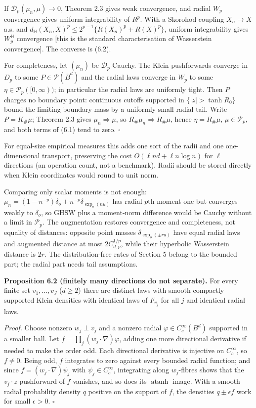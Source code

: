 \documentclass[
  british,
  11pt,
  a4paper,
]{article}
\begin{document}
If \(\mathcal D_p(\mu_n,\mu)\to0\), Theorem 2.3 gives weak convergence,
and radial \(W_p\) convergence gives uniform integrability of \(R^p\).
With a Skorohod coupling \(X_n\to X\) a.s. and
\(d_{\mathbb H}(X_n,X)^p\leq2^{p-1}\{R(X_n)^p+R(X)^p\}\), uniform
integrability gives \(W_p^{\mathbb H}\) convergence {[}this is the
standard characterisation of Wasserstein convergence{]}. The converse is
(6.2).

For completeness, let \((\mu_n)\) be \(\mathcal D_p\)-Cauchy. The Klein
pushforwards converge in \(D_p\) to some
\(P\in\mathcal P(\overline B^d)\) and the radial laws converge in
\(W_p\) to some \(\eta\in\mathcal P_p([0,\infty))\); in particular the
radial laws are uniformly tight. Then \(P\) charges no boundary point:
continuous cutoffs supported in \(\{|z|>\tanh R_0\}\) bound the limiting
boundary mass by a uniformly small radial tail. Write \(P=K_\#\mu\);
Theorem 2.3 gives \(\mu_n\Rightarrow\mu\), so
\(R_\#\mu_n\Rightarrow R_\#\mu\), hence \(\eta=R_\#\mu\),
\(\mu\in\mathcal P_p\), and both terms of (6.1) tend to zero.
\(\square\)

For equal-size empirical measures this adds one sort of the radii and
one one-dimensional transport, preserving the cost
\(O(\ell nd+\ell n\log n)\) for \(\ell\) directions (an operation count,
not a benchmark). Radii should be stored directly when Klein coordinates
would round to unit norm.

Comparing only scalar moments is not enough:
\(\mu_n=(1-n^{-p})\delta_o+n^{-p}\delta_{\exp_o(nu)}\) has radial
\(p\)th moment one but converges weakly to \(\delta_o\), so GHSW plus a
moment-norm difference would be Cauchy without a limit in
\(\mathcal P_p\). The augmentation restores convergence and
completeness, not equality of distances: opposite point masses
\(\delta_{\exp_o(\pm ru)}\) have equal radial laws and augmented
distance at most \(2C_{d,p}^{1/p}\), while their hyperbolic Wasserstein
distance is \(2r\). The distribution-free rates of Section 5 belong to
the bounded part; the radial part needs tail assumptions.

\textbf{Proposition 6.2 (finitely many directions do not separate).} For
every finite set \(v_1,\ldots,v_J\) (\(d\geq2\)) there are distinct laws
with smooth compactly supported Klein densities with identical laws of
\(F_{v_j}\) for all \(j\) and identical radial laws.

\emph{Proof.} Choose nonzero \(w_j\perp v_j\) and a nonzero radial
\(\varphi\in C_c^\infty(B^d)\) supported in a smaller ball. Let
\(f=\prod_j(w_j\cdot\nabla)\varphi\), adding one more directional
derivative if needed to make the order odd. Each directional derivative
is injective on \(C_c^\infty\), so \(f\neq0\). Being odd, \(f\)
integrates to zero against every bounded radial function; and since
\(f=(w_j\cdot\nabla)\psi_j\) with \(\psi_j\in C_c^\infty\), integrating
along \(w_j\)-fibres shows that the \(v_j\cdot z\) pushforward of \(f\)
vanishes, and so does its \(\operatorname{atanh}\) image. With a smooth
radial probability density \(q\) positive on the support of \(f\), the
densities \(q\pm\epsilon f\) work for small \(\epsilon>0\). \(\square\)
\end{document}
